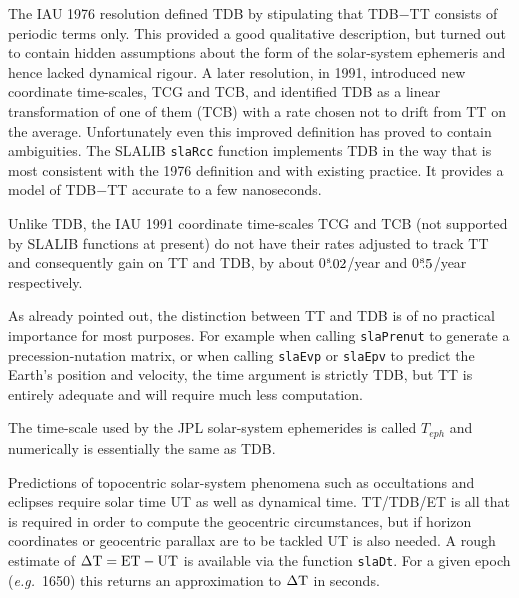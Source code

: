 \documentclass[11pt,fleqn,twoside]{article}
\renewcommand{\_}{{\tt\char'137}}     %
\newcommand{\tseci}[1]   {$#1$\mbox{$^{\rm s}$}}
\newcommand{\tsec}[2]    {\tseci{#1}$\hspace{-0.3em}.#2$}
\begin{document}
The IAU 1976 resolution defined TDB by
stipulating that TDB$-$TT consists of periodic terms only.
This provided
a good qualitative description, but turned out to
contain hidden assumptions about the form of the
solar-system ephemeris and hence lacked dynamical
rigour.  A later resolution, in 1991, introduced new
coordinate time-scales, TCG and TCB, and identified TDB as a
linear transformation of one of them (TCB) with a rate
chosen not to drift from TT on the average.  Unfortunately
even this improved definition has proved to contain
ambiguities.  The SLALIB
{\tt slaRcc} function implements TDB in the way that is
most consistent with the 1976 definition and
with existing practice.  It provides a model of
TDB$-$TT accurate to a few nanoseconds.

Unlike TDB, the IAU 1991 coordinate time-scales TCG and TCB
(not supported by SLALIB functions at present)
do not have their rates adjusted to track TT and consequently
gain on TT and TDB, by about
\tsec{0}{02}/year and \tsec{0}{5}/year respectively.
 
As already pointed out, the distinction between TT and TDB is
of no practical importance for most purposes.  For
example when calling
{\tt slaPrenut}
to generate a precession-nutation matrix, or when calling
{\tt slaEvp} or
{\tt slaEpv}
to predict the
Earth's position and velocity, the time argument is strictly
TDB, but TT is entirely adequate and will require much
less computation.

The time-scale used by the JPL solar-system ephemerides is called
$T_{eph}$ and numerically is essentially the same as TDB.
 
Predictions of topocentric solar-system phenomena such as
occultations and eclipses require solar time UT as well as dynamical
time.  TT/TDB/ET is all that is required in order to compute the geocentric
circumstances, but if horizon coordinates or geocentric parallax
are to be tackled UT is also needed.  A rough estimate
of $\Delta {\rm T} = {\rm ET} - {\rm UT}$ is
available via the function
{\tt slaDt}.
For a given epoch ({\it e.g.}\ 1650) this returns an approximation
to $\Delta {\rm T}$ in seconds.
\end{document}
